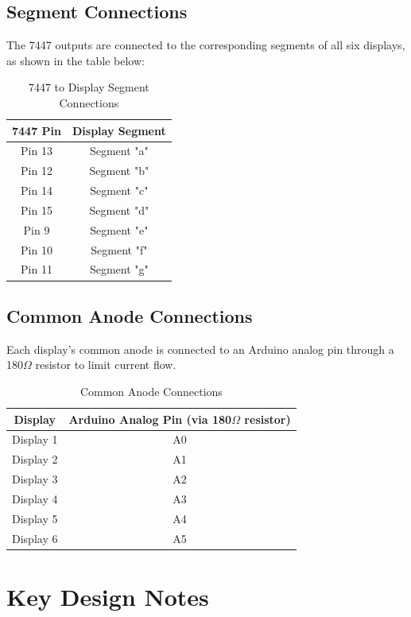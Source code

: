 \documentclass[journal]{IEEEtran}
\begin{document}
\subsection{Segment Connections}
The 7447 outputs are connected to the corresponding segments of all six displays, as shown in the table below:

\begin{table}[H]
    \centering
    \caption{7447 to Display Segment Connections}
    \begin{tabular}{|c|c|}
        \hline
        \textbf{7447 Pin} & \textbf{Display Segment} \\
        \hline
        Pin 13 & Segment "a" \\
        Pin 12 & Segment "b" \\
        Pin 14 & Segment "c" \\
        Pin 15 & Segment "d" \\
        Pin 9  & Segment "e" \\
        Pin 10 & Segment "f" \\
        Pin 11 & Segment "g" \\
        \hline
    \end{tabular}
\end{table}

\subsection{Common Anode Connections}
Each display's common anode is connected to an Arduino analog pin through a 180$\Omega$ resistor to limit current flow.

\begin{table}[H]
    \centering
    \caption{Common Anode Connections}
    \begin{tabular}{|c|c|}
        \hline
        \textbf{Display} & \textbf{Arduino Analog Pin (via 180$\Omega$ resistor)} \\
        \hline
        Display 1 & A0 \\
        Display 2 & A1 \\
        Display 3 & A2 \\
        Display 4 & A3 \\
        Display 5 & A4 \\
        Display 6 & A5 \\
        \hline
    \end{tabular}
\end{table}


\section{Key Design Notes}
\end{document}
